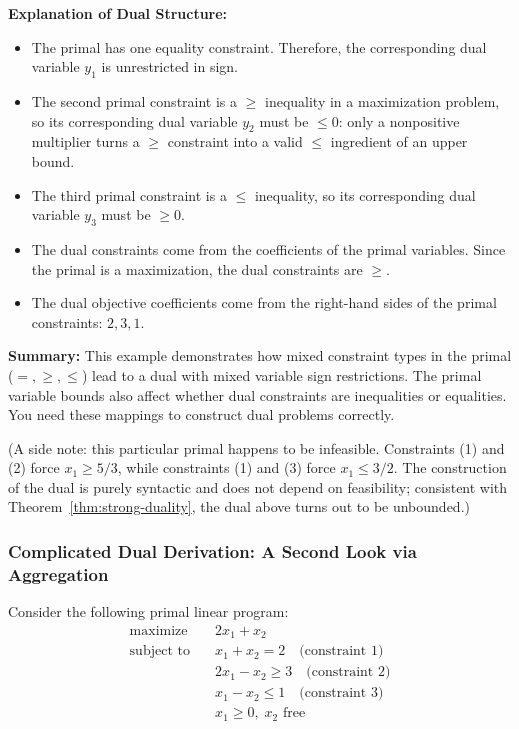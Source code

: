 \textbf{Explanation of Dual Structure:}
\begin{itemize}
    \item The primal has one equality constraint. Therefore, the corresponding dual variable \( y_1 \) is unrestricted in sign.
    \item The second primal constraint is a \( \geq \) inequality in a maximization problem, so its corresponding dual variable \( y_2 \) must be \( \leq 0 \): only a nonpositive multiplier turns a \( \geq \) constraint into a valid \( \leq \) ingredient of an upper bound.
    \item The third primal constraint is a \( \leq \) inequality, so its corresponding dual variable \( y_3 \) must be \( \geq 0 \).
    \item The dual constraints come from the coefficients of the primal variables. Since the primal is a maximization, the dual constraints are \( \geq \).
    \item The dual objective coefficients come from the right-hand sides of the primal constraints: \( 2, 3, 1 \).
\end{itemize}

\textbf{Summary:}
This example demonstrates how mixed constraint types in the primal (\( =, \geq, \leq \)) lead to a dual with mixed variable sign restrictions. The primal variable bounds also affect whether dual constraints are inequalities or equalities. You need these mappings to construct dual problems correctly.

(A side note: this particular primal happens to be infeasible. Constraints (1) and (2) force \( x_1 \geq 5/3 \), while constraints (1) and (3) force \( x_1 \leq 3/2 \). The construction of the dual is purely syntactic and does not depend on feasibility; consistent with Theorem~\ref{thm:strong-duality}, the dual above turns out to be unbounded.)

\subsubsection*{Complicated Dual Derivation: A Second Look via Aggregation}
{}\label{example:complicated-dual-aggregation}
Consider the following primal linear program:
\[
\begin{aligned}
\text{maximize} \quad & 2x_1 + x_2 \\
\text{subject to} \quad
& x_1 + x_2 = 2 \quad \text{(constraint 1)} \\
& 2x_1 - x_2 \geq 3 \quad \text{(constraint 2)} \\
& x_1 - x_2 \leq 1 \quad \text{(constraint 3)} \\
& x_1 \geq 0, \; x_2 \text{ free}
\end{aligned}
\]

